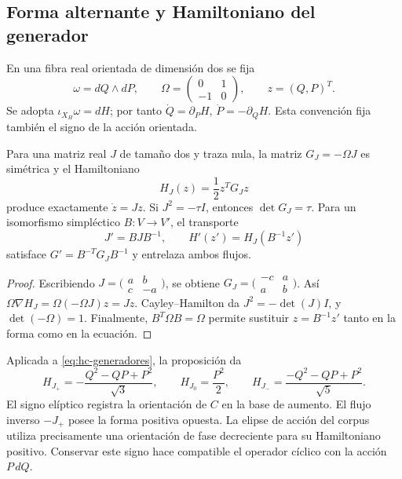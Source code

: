 \subsection{Forma alternante y Hamiltoniano del generador}

En una fibra real orientada de dimensión dos se fija
\[
 \omega=dQ\wedge dP,\qquad
 \Omega=\begin{pmatrix}0&1\\-1&0\end{pmatrix},\qquad z=(Q,P)^T.
\]
Se adopta \(\iota_{X_H}\omega=dH\); por tanto
\(\dot Q=\partial_PH\), \(\dot P=-\partial_QH\).
Esta convención fija también el signo de la acción orientada.

\begin{proposition}
\label{prop:hc-cuadratica}
Para una matriz real \(J\) de tamaño dos y traza nula, la matriz
\(G_J=-\Omega J\) es simétrica y el Hamiltoniano
\begin{equation}
 H_J(z)=\frac12z^TG_Jz
 \label{eq:hc-hj}
\end{equation}
produce exactamente \(\dot z=Jz\). Si \(J^2=-\tau I\),
entonces \(\det G_J=\tau\). Para un isomorfismo simpléctico
\(B:V\to V'\), el transporte
\[
 J'=BJB^{-1},\qquad H'(z')=H_J(B^{-1}z')
\]
satisface \(G'=B^{-T}G_JB^{-1}\) y entrelaza ambos flujos.
\end{proposition}
\begin{proof}
Escribiendo \(J=\bigl(\begin{smallmatrix}a&b\\c&-a\end{smallmatrix}\bigr)\),
se obtiene \(G_J=\bigl(\begin{smallmatrix}-c&a\\a&b\end{smallmatrix}\bigr)\).
Así \(\Omega\nabla H_J=\Omega(-\Omega J)z=Jz\).
Cayley--Hamilton da \(J^2=-\det(J)I\), y
\(\det(-\Omega)=1\). Finalmente, \(B^T\Omega B=\Omega\)
permite sustituir \(z=B^{-1}z'\) tanto en la forma como en la ecuación.
\end{proof}

Aplicada a \eqref{eq:hc-generadores}, la proposición da
\begin{equation}
 H_{J_+}=-\frac{Q^2-QP+P^2}{\sqrt3},\qquad
 H_{J_0}=\frac{P^2}{2},\qquad
 H_{J_-}=\frac{-Q^2-QP+P^2}{\sqrt5}.
 \label{eq:hc-hamiltonianos-nativos}
\end{equation}
El signo elíptico registra la orientación de \(C\) en la base de aumento.
El flujo inverso \(-J_+\) posee la forma positiva opuesta. La elipse
de acción del corpus utiliza precisamente una orientación de fase
decreciente para su Hamiltoniano positivo. Conservar este signo hace
compatible el operador cíclico con la acción \(P\,dQ\).


